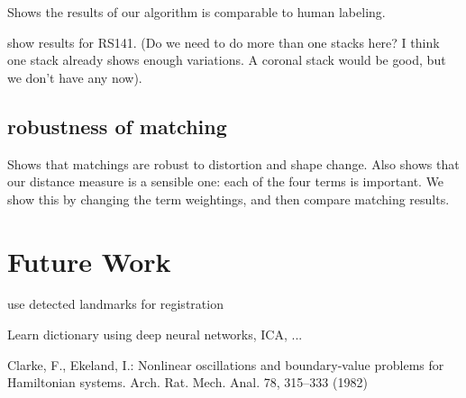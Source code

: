 \documentclass{llncs}
\begin{document}
Shows the results of our algorithm is comparable to human labeling.

show results for RS141. (Do we need to do more than one stacks here? I think one stack already shows enough variations. A coronal stack would be good, but we don't have any now).

\subsection{robustness of matching}

Shows that matchings are robust to distortion and shape change.
Also shows that our distance measure is a sensible one: each of the four terms is important. We show this by changing the term weightings, and then compare matching results.

\section{Future Work}

use detected landmarks for registration

Learn dictionary using deep neural networks, ICA, ...



%
%
\begin{thebibliography}{5}
%
Clarke, F., Ekeland, I.:
Nonlinear oscillations and
boundary-value problems for Hamiltonian systems.
Arch. Rat. Mech. Anal. 78, 315--333 (1982)

\end{thebibliography}
\end{document}

